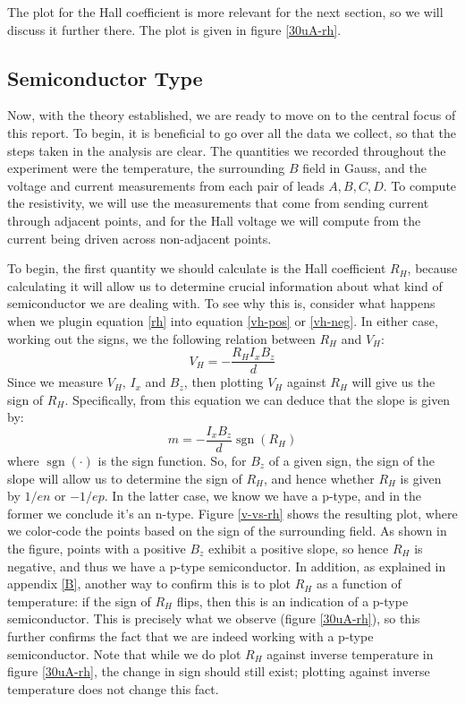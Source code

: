 \documentclass[10pt]{article}
\DeclareMathOperator*{\sgn}{sgn}
\begin{document}
	The plot for the Hall coefficient is more relevant for the next section, so we will discuss it further
	there. The plot is given in figure \ref{30uA-rh}. 

	\subsection{Semiconductor Type}
	Now, with the theory established, we are ready to move on to the central focus of this report. To begin,
	it is beneficial to go over all the data we collect, so that the steps taken in the analysis are clear.
	The quantities we recorded throughout the experiment were the temperature, the surrounding \( B \) field
	in Gauss, and the voltage and current measurements from each pair of leads \( A, B, C, D \). To compute
	the resistivity, we will use the measurements that come from sending current through adjacent points, and
	for the Hall voltage we will compute from the current being driven across non-adjacent points.  

	To begin,
	the first quantity we should calculate is the Hall coefficient \( R_H \), because calculating it will
	allow us to determine crucial information about what kind of semiconductor we are dealing with. To see
	why this is, consider what happens when we plugin equation \ref{rh} into equation \ref{vh-pos} or
	\ref{vh-neg}. In either case, working out the signs, we the following relation between \( R_H \) and \(
	V_H \):
	\[
		V_H = -\frac{R_H I_x B_z}{d}
	\]
	Since we measure \( V_H \), \( I_x \) and \( B_z \), then plotting \( V_H \) against \( R_H \) will give
	us the sign of \( R_H \). Specifically, from this equation we can deduce that the slope is given by:
	\[
		m = - \frac{I_x B_z}{d} \sgn(R_H)
	\]
	where \( \sgn(\cdot) \) is the sign function. So, for \( B_z \) of a given sign, the sign of the slope
	will allow us to determine the sign of \( R_H \), and hence whether \( R_H \) is given by \( 1 / en \)
	or \( -1 / ep \). In the latter case, we know we have a p-type, and in the former we conclude it's an
	n-type. Figure \ref{v-vs-rh} shows the resulting plot, where we color-code the points based on the sign of the
	surrounding field. As shown in the figure, points with a positive \( B_z \) exhibit a positive slope, so
	hence \( R_H \) is negative, and thus we have a p-type semiconductor. In addition, as explained in
	appendix \ref{B}, another way to confirm this is to plot \( R_H \) as a function of temperature: if the
	sign of \( R_H \) flips, then this is an indication of a p-type semiconductor. This is precisely what we
	observe (figure \ref{30uA-rh}), so this further confirms the fact that we are indeed working with a p-type
	semiconductor. Note that while we do plot \( R_H \) against inverse temperature in figure \ref{30uA-rh},
	the change in sign should still exist; plotting against inverse temperature does not change this fact.   
\end{document}
